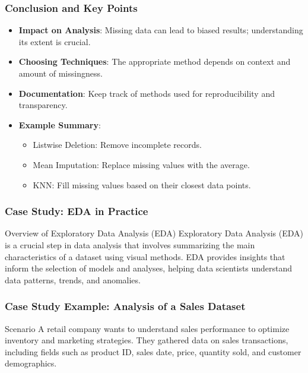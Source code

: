 \documentclass{beamer}
\begin{document}
\begin{frame}[fragile]
    \frametitle{Conclusion and Key Points}
    \begin{itemize}
        \item \textbf{Impact on Analysis}: Missing data can lead to biased results; understanding its extent is crucial.
        \item \textbf{Choosing Techniques}: The appropriate method depends on context and amount of missingness.
        \item \textbf{Documentation}: Keep track of methods used for reproducibility and transparency.
        \item \textbf{Example Summary}:
        \begin{itemize}
            \item Listwise Deletion: Remove incomplete records.
            \item Mean Imputation: Replace missing values with the average.
            \item KNN: Fill missing values based on their closest data points.
        \end{itemize}
    \end{itemize}
\end{frame}

\begin{frame}[fragile]
    \frametitle{Case Study: EDA in Practice}
    \begin{block}{Overview of Exploratory Data Analysis (EDA)}
        Exploratory Data Analysis (EDA) is a crucial step in data analysis that involves summarizing the main characteristics of a dataset using visual methods. 
        EDA provides insights that inform the selection of models and analyses, helping data scientists understand data patterns, trends, and anomalies.
    \end{block}
\end{frame}

\begin{frame}[fragile]
    \frametitle{Case Study Example: Analysis of a Sales Dataset}
    \begin{block}{Scenario}
        A retail company wants to understand sales performance to optimize inventory and marketing strategies.
        They gathered data on sales transactions, including fields such as product ID, sales date, price, quantity sold, and customer demographics.
    \end{block}
\end{frame}
\end{document}
